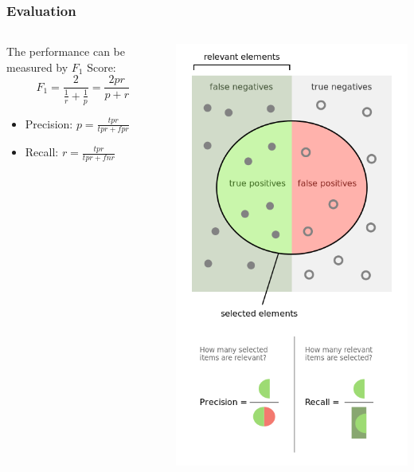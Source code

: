 \documentclass{beamer}
\begin{document}
\begin{frame}
\frametitle{Evaluation}
\begin{columns}
    \begin{column}{0.65\textwidth}
    The performance can be measured by $F_1$ Score:
    $$F_1=\frac{2}{\frac{1}{r}+\frac{1}{p}}=\frac{2pr}{p+r}$$
    \begin{itemize}
        \item Precision: $p=\frac{tpr}{tpr+fpr}$
        \item Recall: $r=\frac{tpr}{tpr+fnr}$
    \end{itemize}
    \end{column}
    \begin{column}{0.35\textwidth}
        \center\includegraphics[width=\textwidth]{figure/precision_recall}
    \end{column}
    \end{columns}
\end{frame}
\end{document}
